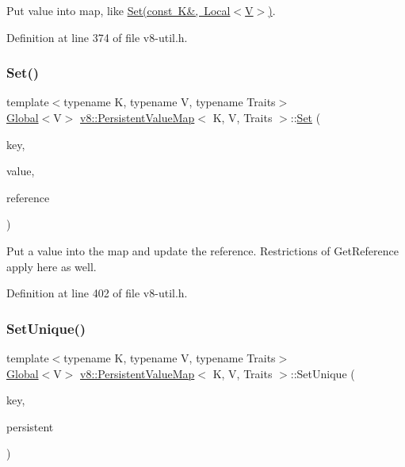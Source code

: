 Put value into map, like \mbox{\hyperlink{classv8_1_1PersistentValueMap_a4527a2e1b25a9f1772317f948382d9f9}{Set(const K\&, Local$<$\+V$>$)}}. 

Definition at line 374 of file v8-\/util.\+h.

\mbox{\label{classv8_1_1PersistentValueMap_a8128f8cff6ed0f3177e966b28cc081ba}} 
\subsubsection{\texorpdfstring{Set()}{Set()}\hspace{0.1cm}{\footnotesize\ttfamily [3/3]}}
{\footnotesize\ttfamily template$<$typename K, typename V, typename Traits$>$ \\
\mbox{\hyperlink{classv8_1_1Global}{Global}}$<$V$>$ \mbox{\hyperlink{classv8_1_1PersistentValueMap}{v8\+::\+Persistent\+Value\+Map}}$<$ K, V, Traits $>$\+::\mbox{\hyperlink{classv8_1_1Set}{Set}} (\begin{DoxyParamCaption}\item[{const K \&}]{key,  }\item[{\mbox{\hyperlink{classv8_1_1Global}{Global}}$<$ V $>$}]{value,  }\item[{\mbox{\hyperlink{classv8_1_1PersistentValueMapBase_1_1PersistentValueReference}{Persistent\+Value\+Reference}} $\ast$}]{reference }\end{DoxyParamCaption})\hspace{0.3cm}{\ttfamily [inline]}}

Put a value into the map and update the reference. Restrictions of Get\+Reference apply here as well. 

Definition at line 402 of file v8-\/util.\+h.

\mbox{\label{classv8_1_1PersistentValueMap_a97ab74c7670e65dd5f95ec2940c4ab11}} 
\subsubsection{\texorpdfstring{Set\+Unique()}{SetUnique()}}
{\footnotesize\ttfamily template$<$typename K, typename V, typename Traits$>$ \\
\mbox{\hyperlink{classv8_1_1Global}{Global}}$<$V$>$ \mbox{\hyperlink{classv8_1_1PersistentValueMap}{v8\+::\+Persistent\+Value\+Map}}$<$ K, V, Traits $>$\+::Set\+Unique (\begin{DoxyParamCaption}\item[{const K \&}]{key,  }\item[{\mbox{\hyperlink{classv8_1_1Global}{Global}}$<$ V $>$ $\ast$}]{persistent }\end{DoxyParamCaption})\hspace{0.3cm}{\ttfamily [inline]}}

